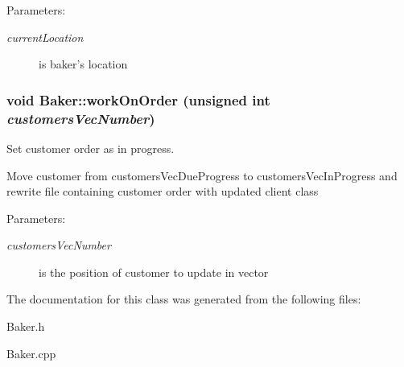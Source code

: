 \begin{Desc}
\item[Parameters:]
\begin{description}
\item[{\em current\-Location}]is baker's location \end{description}
\end{Desc}
\hypertarget{class_baker_9616413c80f3814907a9c2399ac50438}{
\subsubsection[workOnOrder]{\setlength{\rightskip}{0pt plus 5cm}void Baker::work\-On\-Order (unsigned int {\em customers\-Vec\-Number})}}
\label{class_baker_9616413c80f3814907a9c2399ac50438}


Set customer order as in progress. 

Move customer from customers\-Vec\-Due\-Progress to customers\-Vec\-In\-Progress and rewrite file containing customer order with updated client class

\begin{Desc}
\item[Parameters:]
\begin{description}
\item[{\em customers\-Vec\-Number}]is the position of customer to update in vector \end{description}
\end{Desc}


The documentation for this class was generated from the following files:\begin{CompactItemize}
\item 
Baker.h\item 
Baker.cpp\end{CompactItemize}
